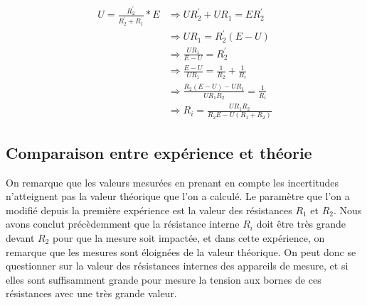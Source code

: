 \documentclass[10pt]{article}
\begin{document}
\begin{table}[h!]
    \begin{equation}
        \begin{split}
            U = \frac{R_2^{'}}{R_2^{'} + R_1} * E & \Rightarrow U R_2^{'} + U R_1 = E R_2^{'} \\
            & \Rightarrow U R_1 = R_2^{'} (E - U) \\
            & \Rightarrow \frac{U R_1}{E - U} = R_2^{'} \\
            & \Rightarrow \frac{E - U}{UR_1} = \frac{1}{R_2} + \frac{1}{R_i} \\
            & \Rightarrow \frac{R_2 (E - U) - U R_1}{UR_1R_2} = \frac{1}{R_i} \\
            & \Rightarrow R_i = \frac{U R_1 R_2}{R_2 E - U (R_1 + R_2)}
        \end{split}
        \label{eqn:ri}
    \end{equation}

    \subsection{Comparaison entre expérience et théorie}
    On remarque que les valeurs mesurées en prenant en compte les incertitudes n'atteignent pas la valeur théorique que l'on a calculé.
    Le paramètre que l'on a modifié depuis la première expérience est la valeur des résistances $R_1$ et $R_2$. 
    Nous avons conclut précèdemment que la résistance interne $R_i$ doit être très grande devant $R_2$ pour que la mesure soit impactée,
    et dans cette expérience, on remarque que les mesures sont éloignées de la valeur théorique. 
    On peut donc se questionner sur la valeur des résistances internes des appareils de mesure, et si elles sont suffisamment grande
    pour mesure la tension aux bornes de ces résistances avec une très grande valeur.
	
\end{table}
\end{document}
